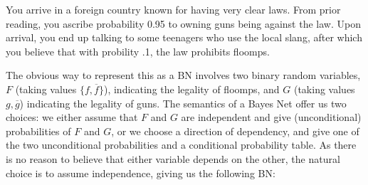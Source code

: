 \documentclass{article}
\numberwithin{equation}{section}
\begin{document}
	\begin{example}
		\label{ex:guns-and-floomps}
		You arrive in a foreign country known for having very clear laws. From prior reading, you ascribe probability 0.95 to owning guns being against the law. Upon arrival, you end up talking to some teenagers who use the local slang, after which you believe that with probility .1, the law prohibits floomps. 
		
		The obvious way to represent this as a BN involves two binary random variables, $F$ (taking values $\{f, \overline f\}$), indicating the legality of floomps, and $G$ (taking values $g, \overline g$) indicating the legality of guns. The semantics of a Bayes Net offer us two choices: we either assume that $F$ and $G$ are independent and give (unconditional) probabilities of $F$ and $G$, or we choose a direction of dependency,
   and give one of the two unconditional probabilities and a conditional probability table. As there is no reason to believe that either variable depends on the other, the natural choice is to assume independence, giving us the following BN:
		
		
		\begin{center}
		\end{center}
		

\end{example}
\end{document}
